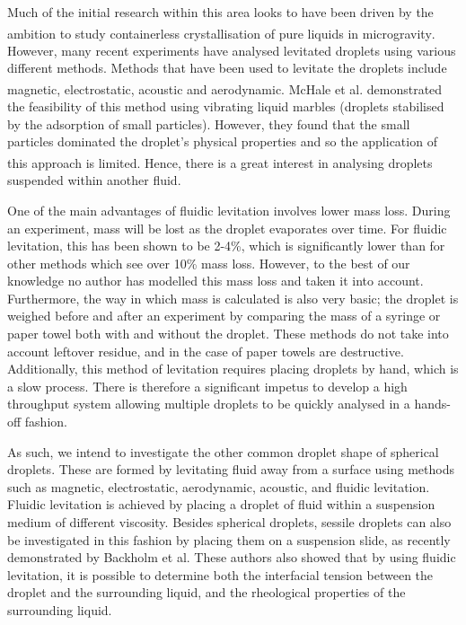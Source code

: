 \documentclass{physics_article_B}
\begin{document}
Much of the initial research within this area looks to have been driven by the ambition to study containerless crystallisation of pure liquids in microgravity\textsuperscript{\cite{wilkes}}. However, many recent experiments have analysed levitated droplets using various different methods. Methods that have been used to levitate the droplets include magnetic\textsuperscript{\cite{hill}}, electrostatic\textsuperscript{\cite{mugele}}, acoustic\textsuperscript{\cite{trinh}} and aerodynamic\textsuperscript{\cite{benmore}}. McHale et al. demonstrated the feasibility of this method using vibrating liquid marbles (droplets stabilised by the adsorption of small particles). However, they found that the small particles dominated the droplet's physical properties and so the application of this approach is limited\textsuperscript{\cite{mchale}}. Hence, there is a great interest in analysing droplets suspended within another fluid. 

One of the main advantages of fluidic levitation involves lower mass loss. During an experiment, mass will be lost as the droplet evaporates over time. For fluidic levitation, this has been shown to be 2-4\%, which is significantly lower than for other methods which see over 10\% \cite{harrold2} mass loss. However, to the best of our knowledge no author has modelled this mass loss and taken it into account. Furthermore, the way in which mass is calculated is also very basic; the droplet is weighed before and after an experiment by comparing the mass of a syringe or paper towel both with and without the droplet. These methods do not take into account leftover residue, and in the case of paper towels are destructive. Additionally, this method of levitation requires placing droplets by hand, which is a slow process. There is therefore a significant impetus to develop a high throughput system allowing multiple droplets to be quickly analysed in a hands-off fashion.

As such, we intend to investigate the other common droplet shape of spherical droplets. These are formed by levitating fluid away from a surface using methods such as magnetic\cite{temperton, hill}, electrostatic\cite{mugele, wong}, aerodynamic\cite{benmore}, acoustic\cite{Temperton2012, Yarin1998}, and fluidic levitation. Fluidic levitation is achieved by placing a droplet of fluid within a suspension medium of different viscosity. Besides spherical droplets, sessile droplets can also be investigated in this fashion by placing them on a suspension slide, as recently demonstrated by Backholm et al\cite{Backholm2017}. These authors also showed that\cite{Backholm2017} by using fluidic levitation, it is possible to determine both the interfacial tension between the droplet and the surrounding liquid, and the rheological properties of the surrounding liquid. %
\end{document}
